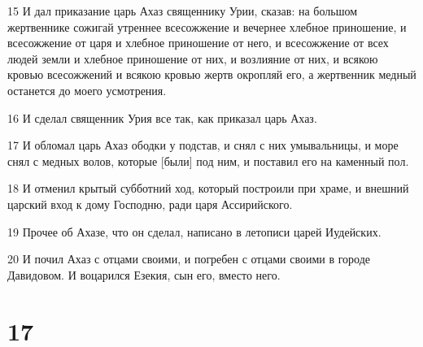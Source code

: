 \par 15 И дал приказание царь Ахаз священнику Урии, сказав: на большом жертвеннике сожигай утреннее всесожжение и вечернее хлебное приношение, и всесожжение от царя и хлебное приношение от него, и всесожжение от всех людей земли и хлебное приношение от них, и возлияние от них, и всякою кровью всесожжений и всякою кровью жертв окропляй его, а жертвенник медный останется до моего усмотрения.
\par 16 И сделал священник Урия все так, как приказал царь Ахаз.
\par 17 И обломал царь Ахаз ободки у подстав, и снял с них умывальницы, и море снял с медных волов, которые [были] под ним, и поставил его на каменный пол.
\par 18 И отменил крытый субботний ход, который построили при храме, и внешний царский вход к дому Господню, ради царя Ассирийского.
\par 19 Прочее об Ахазе, что он сделал, написано в летописи царей Иудейских.
\par 20 И почил Ахаз с отцами своими, и погребен с отцами своими в городе Давидовом. И воцарился Езекия, сын его, вместо него.

\chapter{17}

